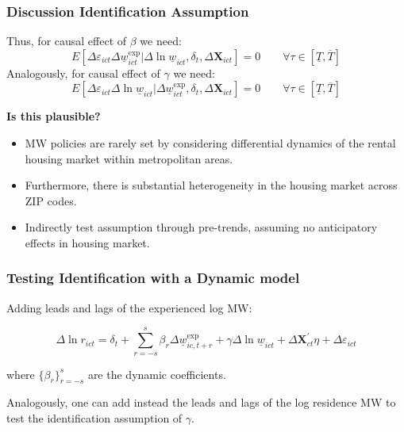 \documentclass[aspectratio=169]{beamer}
\begin{document}
\begin{frame}
	\frametitle{Discussion Identification Assumption}
	
	Thus, for causal effect of $\beta$ we need:
	$$
	E \left[\Delta \varepsilon_{ict} \Delta \underline{w}^{\text{exp}}_{ict}  
	\big| \Delta \ln \underline{w}_{ict}, \delta_t, \Delta 
	\mathbf{X}_{ict} \right] = 0
	\quad \quad \forall \tau \in \left[ \underline{T}, \overline{T} \right]
	$$
	\vspace{.5mm}
	Analogously, for causal effect of $\gamma$ we need:
	$$
	E \left[\Delta \varepsilon_{ict} \Delta \ln \underline{w}_{ict}  
	\big| \Delta \underline{w}^{\text{exp}}_{ict}, \delta_t, \Delta \mathbf{X}_{ict} 
	\right] = 0
	\quad \quad \forall \tau \in \left[ \underline{T}, \overline{T} \right]
	$$
	
	\pause
	\vspace{.5mm}
	\textbf{Is this plausible?}
	\begin{itemize} \small
		\vspace{.5mm}
		\item MW policies are rarely set by considering differential dynamics of the 
		rental housing market within metropolitan areas.
		
		\vspace{.5mm}
		\item Furthermore, there is substantial heterogeneity in the housing market 
		across ZIP codes.
		
		\vspace{.5mm}
		\item Indirectly test assumption through pre-trends, assuming no anticipatory 
		effects in housing market.
	\end{itemize}
\end{frame}

\begin{frame}[label = dyn_model]
	\frametitle{Testing Identification with a Dynamic model}
	
	Adding leads and lags of the experienced log MW:
	
	$$
	\Delta \ln r_{ict} = \delta_t
		+ \sum_{r=-s}^{s} \beta_r \Delta \underline{w}^{\text{exp}}_{ic,t+r}
		+ \gamma \Delta \ln \underline{w}_{ict}
		+ \Delta \mathbf{X}^{'}_{ct}\eta
		+ \Delta \varepsilon_{ict}
    $$
	
	where $\{\beta_r\}_{r=-s}^{s}$ are the dynamic coefficients.
	
	\vspace{1mm}

    Analogously, one can add instead the leads and lags of the log residence MW
    to test the identification assumption of $\gamma$.
\end{frame}
\end{document}
